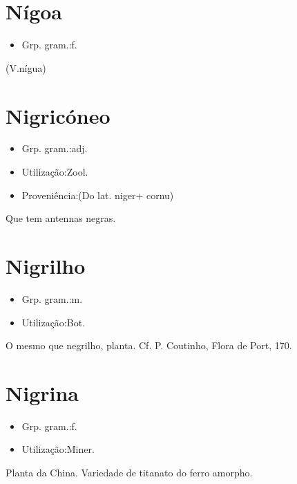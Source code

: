 \section{Nígoa}
\begin{itemize}
\item {Grp. gram.:f.}
\end{itemize}
(V.nígua)
\section{Nigricóneo}
\begin{itemize}
\item {Grp. gram.:adj.}
\end{itemize}
\begin{itemize}
\item {Utilização:Zool.}
\end{itemize}
\begin{itemize}
\item {Proveniência:(Do lat. \textunderscore niger\textunderscore  + \textunderscore cornu\textunderscore )}
\end{itemize}
Que tem antennas negras.
\section{Nigrilho}
\begin{itemize}
\item {Grp. gram.:m.}
\end{itemize}
\begin{itemize}
\item {Utilização:Bot.}
\end{itemize}
O mesmo que \textunderscore negrilho\textunderscore , planta. Cf. P. Coutinho, \textunderscore Flora de Port\textunderscore , 170.
\section{Nigrina}
\begin{itemize}
\item {Grp. gram.:f.}
\end{itemize}
\begin{itemize}
\item {Utilização:Miner.}
\end{itemize}
Planta da China.
Variedade de titanato do ferro amorpho.
